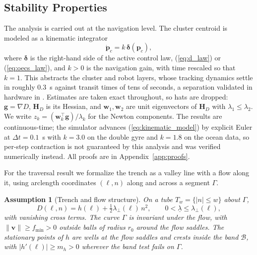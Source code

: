 \documentclass[lettersize,journal]{IEEEtran}
\newtheorem{assumption}{Assumption}
\begin{document}
\subsection{Stability Properties}
\label{sec:stability}

The analysis is carried out at the navigation level. The cluster
centroid is modeled as a kinematic integrator
\begin{equation}
    \dot{\mathbf{p}}_c = k\,\boldsymbol{\delta}(\mathbf{p}_c),
    \label{eq:kinematic_model}
\end{equation}
where $\boldsymbol{\delta}$ is the right-hand side of the active control
law, (\ref{eq:d_law}) or (\ref{eq:oecs_law}), and $k > 0$ is the
navigation gain, with time rescaled so that $k = 1$. This abstracts the
cluster and robot layers, whose tracking dynamics settle in roughly
0.3~s against transit times of tens of seconds, a separation validated
in hardware in \cite{14}. Estimates are taken exact throughout, so hats
are dropped: $\mathbf{g} = \nabla D$, $\mathbf{H}_D$ is its Hessian, and
$\mathbf{w}_1, \mathbf{w}_2$ are unit eigenvectors of $\mathbf{H}_D$
with $\lambda_1 \leq \lambda_2$. We write $z_k = (\mathbf{w}_k^\top
\mathbf{g})/\lambda_k$ for the Newton components. The results are
continuous-time; the simulator advances (\ref{eq:kinematic_model}) by
explicit Euler at $\Delta t = 0.1$~s with $k = 3.0$ on the double gyre
and $k = 1.8$ on the ocean data, so per-step contraction is not
guaranteed by this analysis and was verified numerically instead. All
proofs are in Appendix~\ref{app:proofs}.

For the traversal result we formalize the trench as a valley line with a
flow along it, using arclength coordinates $(\ell, n)$ along and across
a segment $\Gamma$.

\begin{assumption}[Trench and flow structure]
\label{ass:trench}
On a tube $T_w = \{|n| \leq w\}$ about $\Gamma$,
\begin{equation}
    D(\ell, n) = h(\ell) + \tfrac{1}{2}\lambda_\perp(\ell)\,n^2,
    \qquad 0 < \underline{\lambda} \leq \lambda_\perp(\ell),
    \label{eq:normal_form}
\end{equation}
with vanishing cross terms. The curve
$\Gamma$ is invariant under the flow, with $\|\mathbf{v}\| \geq f_{\min}
> 0$ outside balls of radius $r_0$ around the flow saddles. The
stationary points of $h$ are wells at the flow saddles and crests inside
the band $\mathcal{B}$, with $|h'(\ell)| \geq m_h > 0$ wherever the band
test fails on $\Gamma$.
\end{assumption}
\end{document}
